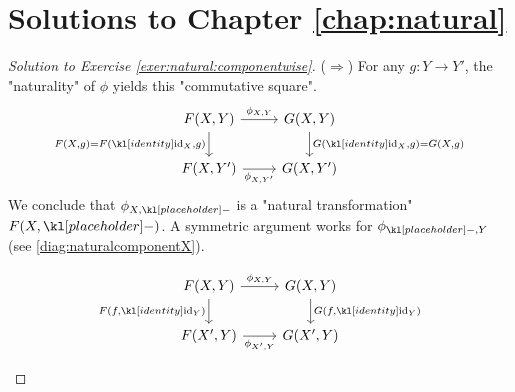 \documentclass[main.tex]{subfiles}
\begin{document}
\section{Solutions to Chapter \ref{chap:natural}}
\begin{proof}[Solution to Exercise \ref{exer:natural:componentwise}]\label{soln:natural:componentwise}
    ($\Rightarrow$) For any $g: Y \rightarrow Y'$, the "naturality" of $\phi$ yields this "commutative square".
    \begin{equation}\label{diag:naturalcomponentY}
        \begin{tikzcd}
            {F(X,Y)} & {G(X,Y)} \\
            {F(X,Y')} & {G(X,Y')}
            \arrow["{F(X,g) = F(\id_X,g)}"', from=1-1, to=2-1]
            \arrow["{\phi_{X,Y}}", from=1-1, to=1-2]
            \arrow["{G(\id_X,g) = G(X,g)}", from=1-2, to=2-2]
            \arrow["{\phi_{X,Y'}}"', from=2-1, to=2-2]
        \end{tikzcd}
    \end{equation}
    We conclude that $\phi_{X,\placeholder}$ is a "natural transformation" $F(X,\placeholder)$. A symmetric argument works for $\phi_{\placeholder,Y}$ (see \eqref{diag:naturalcomponentX}).\begin{marginfigure}[-4\baselineskip]
        \begin{equation}\label{diag:naturalcomponentX}
        \begin{tikzcd}
            {F(X,Y)} & {G(X,Y)} \\
            {F(X',Y)} & {G(X',Y)}
            \arrow["{\phi_{X,Y}}", from=1-1, to=1-2]
            \arrow["{\phi_{X',Y}}"', from=2-1, to=2-2]
            \arrow["{F(f,\id_Y)}"', from=1-1, to=2-1]
            \arrow["{G(f,\id_Y)}", from=1-2, to=2-2]
        \end{tikzcd}
        \end{equation}
    \end{marginfigure}


\end{proof}
\end{document}
